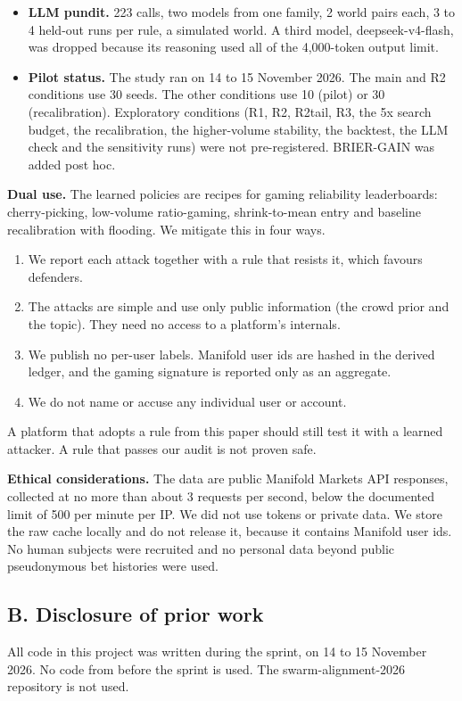 \documentclass[10pt]{article}
\begin{document}
\begin{itemize}
\item \textbf{LLM pundit.} 223 calls, two models from one family, 2 world pairs each, 3 to 4 held-out runs per rule, a simulated world. A third model, deepseek-v4-flash, was dropped because its reasoning used all of the 4,000-token output limit.
\item \textbf{Pilot status.} The study ran on 14 to 15 November 2026. The main and R2 conditions use 30 seeds. The other conditions use 10 (pilot) or 30 (recalibration). Exploratory conditions (R1, R2, R2tail, R3, the 5x search budget, the recalibration, the higher-volume stability, the backtest, the LLM check and the sensitivity runs) were not pre-registered. BRIER-GAIN was added post hoc.
\end{itemize}

\textbf{Dual use.} The learned policies are recipes for gaming reliability leaderboards: cherry-picking, low-volume ratio-gaming, shrink-to-mean entry and baseline recalibration with flooding. We mitigate this in four ways.
\begin{enumerate}\setlength{\itemsep}{1pt}\setlength{\parskip}{0pt}
\item We report each attack together with a rule that resists it, which favours defenders.
\item The attacks are simple and use only public information (the crowd prior and the topic). They need no access to a platform's internals.
\item We publish no per-user labels. Manifold user ids are hashed in the derived ledger, and the gaming signature is reported only as an aggregate.
\item We do not name or accuse any individual user or account.
\end{enumerate}
A platform that adopts a rule from this paper should still test it with a learned attacker. A rule that passes our audit is not proven safe.

\textbf{Ethical considerations.} The data are public Manifold Markets API responses, collected at no more than about 3 requests per second, below the documented limit of 500 per minute per IP. We did not use tokens or private data. We store the raw cache locally and do not release it, because it contains Manifold user ids. No human subjects were recruited and no personal data beyond public pseudonymous bet histories were used.

\subsection*{B. Disclosure of prior work}
All code in this project was written during the sprint, on 14 to 15 November 2026. No code from before the sprint is used. The swarm-alignment-2026 repository is not used.
\end{document}
